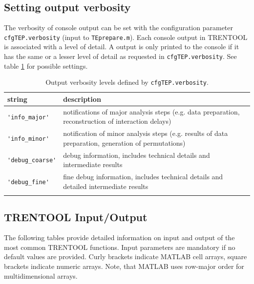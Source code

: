 \documentclass[a4paper,10pt]{article}
\begin{document}
\subsection{Setting output verbosity} \label{sec:verbosity}
The verbosity of console output can be set with the configuration parameter \verb&cfgTEP.verbosity& (input to \verb&TEprepare.m&). Each console output in TRENTOOL is associated with a level of detail. A output is only printed to the console if it has the same or a lesser level of detail as requested in \verb&cfgTEP.verbosity&. See table \ref{tab:verbosity} for possible settings.

\begin{table}[H]
\small
\caption[Output Verbosity Levels]{Output verbosity levels defined by \texttt{cfgTEP.verbosity}.} 
\begin{tabular}{p{2.5cm}p{10cm}} \toprule
\textbf{string} & \textbf{description} \\ \midrule
\verb+'info_major'+ & notifications of major analysis steps (e.g. data preparation, reconstruction of interaction delays)\\
\rowcolor{Gray}
\verb+'info_minor'+ & notification of minor analysis steps (e.g. results of data preparation, generation of permutations)\\
\verb+'debug_coarse'+ & debug information, includes technical details and intermediate results\\
\rowcolor{Gray}
\verb+'debug_fine'+ & fine debug information, includes technical details and detailed intermediate results\\
\bottomrule
\label{tab:verbosity}
\end{tabular}
\end{table}


\subsection{TRENTOOL Input/Output}

The following tables provide detailed information on input and output of the most common TRENTOOL functions. Input parameters are mandatory if no default values are provided. Curly brackets indicate MATLAB cell arrays, square brackets indicate numeric arrays. Note, that MATLAB uses row-major order for multidimensional arrays.


\onehalfspacing

\end{document}
